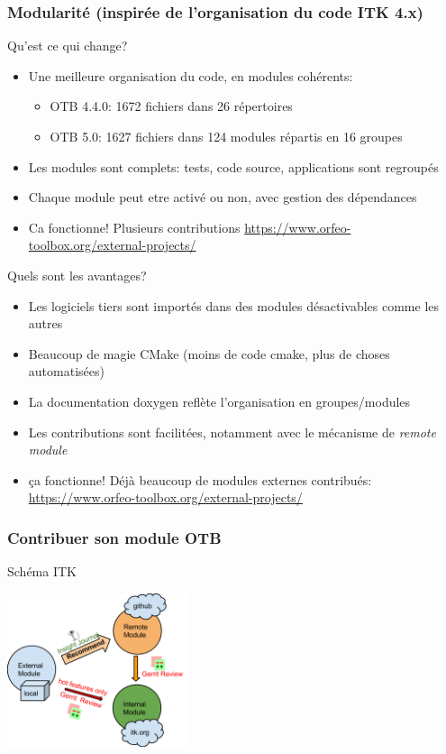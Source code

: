 \documentclass[8pt]{beamer}
\begin{document}
\begin{frame}
\frametitle{Modularité (inspirée de l'organisation du code ITK 4.x)}
\begin{block}{Qu'est ce qui change?}
\begin{itemize}
\item Une meilleure organisation du code, en modules cohérents:
  \begin{itemize}
    \item OTB 4.4.0: 1672 fichiers dans 26 répertoires
    \item OTB 5.0: 1627 fichiers dans 124 modules répartis en 16 groupes
  \end{itemize}
\item Les modules sont complets: tests, code source, applications sont regroupés
\item Chaque module peut etre activé ou non, avec gestion des dépendances
\item Ca fonctionne! Plusieurs contributions \url{https://www.orfeo-toolbox.org/external-projects/}

\end{itemize}
\end{block}

\begin{block}{Quels sont les avantages?}
\begin{itemize}
\item Les logiciels tiers sont importés dans des modules désactivables comme les autres
\item Beaucoup de magie CMake (moins de code cmake, plus de choses automatisées)
\item La documentation doxygen reflète l'organisation en groupes/modules
\item Les contributions sont facilitées, notamment avec le mécanisme de
  \textit{remote module}
\item ça fonctionne! Déjà beaucoup de modules externes contribués: \url{https://www.orfeo-toolbox.org/external-projects/}
\end{itemize}
\end{block}
\end{frame}

\begin{frame}
\frametitle{Contribuer son module OTB}
\begin{block}{Schéma ITK}
\begin{center}
 \includegraphics[width=0.4\textwidth]{images/itk-remote-module.png}
\end{center}
\end{block}
\end{frame}
\end{document}
